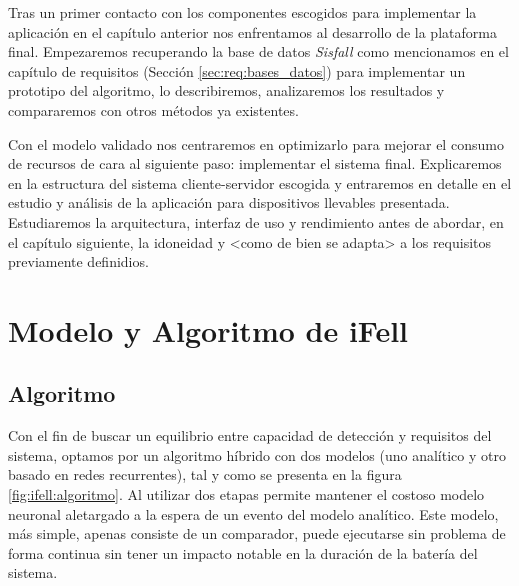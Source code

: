 
\begin{comment}
Aportar detalles del proceso de desarrollo incluyendo fases e hitos del proceso, diagramas representativos de la arquitectura y funcionamiento, capturas de pantalla para ilustrar el funcionamiento, etc.
\end{comment}

Tras un primer contacto con los componentes escogidos para implementar la aplicación en el capítulo anterior nos enfrentamos al desarrollo de la plataforma final. Empezaremos recuperando la base de datos \textit{Sisfall} como mencionamos en el capítulo de requisitos (Sección \ref{sec:req:bases_datos}) para implementar un prototipo del algoritmo, lo describiremos, analizaremos los resultados y compararemos con otros métodos ya existentes.

Con el modelo validado nos centraremos en optimizarlo para mejorar el consumo de recursos de cara al siguiente paso: implementar el sistema final. Explicaremos en la estructura del sistema cliente-servidor escogida y entraremos en detalle en el estudio y análisis de la aplicación para dispositivos llevables presentada. Estudiaremos la arquitectura, interfaz de uso y rendimiento antes de abordar, en el capítulo siguiente, la idoneidad y <como de bien se adapta> a los requisitos previamente definidios.

\section{Modelo y Algoritmo de iFell}\label{sec:imp:model}

\subsection{Algoritmo}\label{sub:imp:model:algoritmo}

Con el fin de buscar un equilibrio entre capacidad de detección y requisitos del sistema, optamos por un algoritmo híbrido con dos modelos (uno analítico y otro basado en redes recurrentes), tal y como se presenta en la figura \ref{fig:ifell:algoritmo}. Al utilizar dos etapas permite mantener el costoso modelo neuronal aletargado a la espera de un evento del modelo analítico. Este modelo, más simple, apenas consiste de un comparador, puede ejecutarse sin problema de forma continua sin tener un impacto notable en la duración de la batería del sistema.


